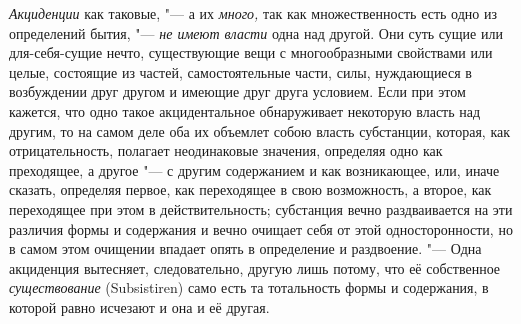 {\em Акциденции} как таковые, "--- а их
{\em много,} так как множественность есть одно из
определений бытия, "--- {\em не имеют власти} одна над
другой. Они суть сущие или для-себя-сущие нечто, существующие вещи с
многообразными свойствами или целые, состоящие из частей, самостоятельные
части, силы, нуждающиеся в возбуждении друг другом и имеющие друг друга
условием. Если при этом кажется, что одно такое акцидентальное обнаруживает
некоторую власть над другим, то на самом деле оба их объемлет собою власть
субстанции, которая, как отрицательность, полагает неодинаковые значения,
определяя одно как преходящее, а другое "--- с другим содержанием и как
возникающее, или, иначе сказать, определяя первое, как переходящее в свою
возможность, а второе, как переходящее при этом в действительность;
субстанция вечно раздваивается на эти различия формы и содержания и вечно
очищает себя от этой односторонности, но в самом этом очищении впадает
опять в определение и раздвоение. "--- Одна акциденция вытесняет,
следовательно, другую лишь потому, что её собственное
{\em существование} (Subsistiren) само есть та
тотальность формы и содержания, в которой равно исчезают и она и её другая.

